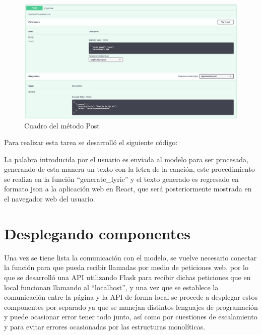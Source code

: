\documentclass[12pt, a4paper, titlepage]{article}
\begin{document}
	\begin{figure}[H]
		\includegraphics[width=13.5cm]{./Imagenes/BackEnd/Post.png}
		\centering 
		\caption{Cuadro del método Post}
	\end{figure}
	Para realizar esta tarea se desarrolló el siguiente código:
	\begin{center}
		
	\end{center}
	La palabra introducida por el usuario es enviada al modelo para ser procesada,  generando de esta manera un texto con la letra de la canción, este procedimiento se realiza en la función “generate\_lyric” y el texto generado es regresado en formato json a la aplicación web en React, que será posteriormente mostrada en el navegador web del usuario.
	\newpage
	\section{Desplegando componentes}
		Una vez se tiene lista la comunicación con el modelo, se vuelve necesario conectar la función para que pueda recibir llamadas por medio de peticiones web, por lo que se desarrolló una API utilizando Flask para recibir dichas peticiones que en local funcionan llamando al “localhost”, y una vez que se establece la comunicación entre la página y la API de forma local se procede a desplegar estos componentes por separado ya que se manejan distintos lenguajes de programación y puede ocasionar error tener todo junto, así como por cuestiones de escalamiento y para evitar errores ocasionadas por las estructuras monolíticas.
		
\end{document}
